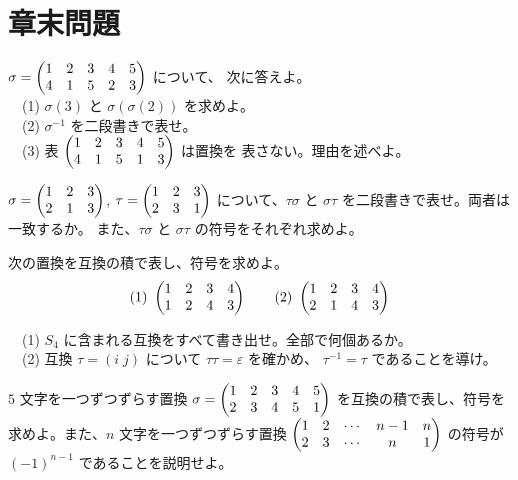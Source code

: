 \section*{章末問題}

\begin{mondai}[基本]\label{q:perm-ex1}
$\sigma = \begin{pmatrix}1 & 2 & 3 & 4 & 5 \\ 4 & 1 & 5 & 2 & 3\end{pmatrix}$ について、
次に答えよ。\\
　(1) $\sigma(3)$ と $\sigma(\sigma(2))$ を求めよ。\\
　(2) $\sigma^{-1}$ を二段書きで表せ。\\
　(3) 表 $\begin{pmatrix}1 & 2 & 3 & 4 & 5 \\ 4 & 1 & 5 & 1 & 3\end{pmatrix}$ は置換を
表さない。理由を述べよ。
\end{mondai}

\begin{mondai}[基本]\label{q:perm-ex2}
$\sigma = \begin{pmatrix}1 & 2 & 3 \\ 2 & 1 & 3\end{pmatrix}$,
$\tau = \begin{pmatrix}1 & 2 & 3 \\ 2 & 3 & 1\end{pmatrix}$ について、$\tau\sigma$ と
$\sigma\tau$ を二段書きで表せ。両者は一致するか。
また、$\tau\sigma$ と $\sigma\tau$ の符号をそれぞれ求めよ。
\end{mondai}

\begin{mondai}[基本]\label{q:perm-ex3}
次の置換を互換の積で表し、符号を求めよ。
\[
(1)\ \begin{pmatrix}1 & 2 & 3 & 4 \\ 1 & 2 & 4 & 3\end{pmatrix} \qquad
(2)\ \begin{pmatrix}1 & 2 & 3 & 4 \\ 2 & 1 & 4 & 3\end{pmatrix}
\]
\end{mondai}

\begin{mondai}[基本]\label{q:perm-ex4}
　(1) $S_4$ に含まれる互換をすべて書き出せ。全部で何個あるか。\\
　(2) 互換 $\tau = (i\;j)$ について $\tau\tau = \varepsilon$ を確かめ、
$\tau^{-1} = \tau$ であることを導け。
\end{mondai}

\begin{mondai}[標準]\label{q:perm-ex5}
$5$ 文字を一つずつずらす置換
$\sigma = \begin{pmatrix}1 & 2 & 3 & 4 & 5 \\ 2 & 3 & 4 & 5 & 1\end{pmatrix}$
を互換の積で表し、符号を求めよ。また、$n$ 文字を一つずつずらす置換
$\begin{pmatrix}1 & 2 & \cdots & n-1 & n \\ 2 & 3 & \cdots & n & 1\end{pmatrix}$ の符号が
$(-1)^{n-1}$ であることを説明せよ。
\end{mondai}

